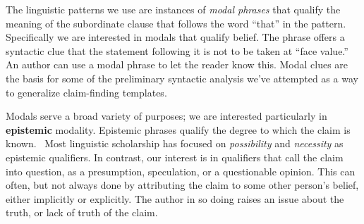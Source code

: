 
The linguistic patterns we use are instances of {\it modal phrases} that qualify the meaning of the subordinate clause that follows the word ``that'' in the pattern. Specifically we are interested in
modals that qualify belief.  The phrase offers a syntactic clue that the statement following it
is not to be taken at ``face value.''  An author can use a modal phrase to let the reader know
this.  Modal clues are the basis for some of the preliminary syntactic analysis
we've attempted as a way to generalize claim-finding templates. 

Modals serve a broad variety of purposes;
we are interested particularly in  {\bf epistemic} modality. Epistemic phrases qualify the
degree to which the claim is known.~\cite{Palmer.2001} Most linguistic scholarship has focused on {\it
possibility} and {\it necessity} as epistemic qualifiers. In
contrast, our interest is in qualifiers that call the claim into
question, as a presumption, speculation, or a questionable
opinion. This can often, but not always done by attributing the claim
to some other person's belief, either implicitly or explicitly. The
author in so doing raises an issue about the truth, or lack of truth
of the claim.